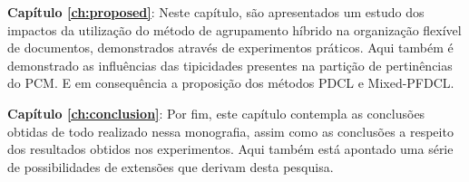 {\bf Capítulo \ref{ch:proposed}\/}: Neste capítulo, são apresentados um estudo dos impactos da
utilização do método de agrupamento híbrido na organização flexível de documentos, demonstrados
através de experimentos práticos. Aqui também é demonstrado as influências das tipicidades presentes
na partição de pertinências do PCM. E em consequência a proposição dos métodos PDCL e Mixed-PFDCL. 

{\bf Capítulo \ref{ch:conclusion}\/}: Por fim, este capítulo contempla as conclusões obtidas de todo
realizado nessa monografia, assim como as conclusões a respeito dos resultados obtidos nos
experimentos. Aqui também está apontado uma série de possibilidades de extensões que derivam desta
pesquisa. 
